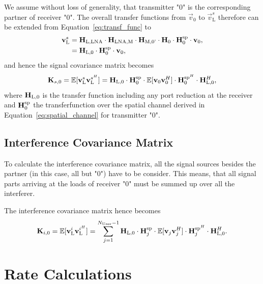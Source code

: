 We assume without loss of generality, that transmitter "0" is the corresponding partner of receiver "0".
The overall transfer functions from $\vec{v}_0$ to $\vec{v}_\text{L}^s$ therefore can be extended from Equation~\eqref{eq:transf_func} to
\begin{align}
\label{eq:transfer_function}
 \mathbf{v}_\text{L}^s&= \mathbf{H}_\text{L,LNA}\cdot\mathbf{H}_\text{LNA,M}\cdot\mathbf{H}_\text{M,0'}
		\cdot \mathbf{H}_0\cdot\mathbf{H}_{0}^{\text{sp}} \cdot\mathbf{v}_0,\\\nonumber
 &=\mathbf{H}_\text{L,0}\cdot \mathbf{H}_{0}^{\text{sp}}\cdot\mathbf{v}_0,
\end{align}
and hence the signal covariance matrix becomes
\begin{equation}
\label{eq:sig_cov}
\mathbf{K}_{s,0}=\mathbb{E}[\mathbf{v}_\text{L}^s\mathbf{v}_\text{L}^{s^H}] = 
	\mathbf{H}_\text{L,0}\cdot \mathbf{H}_{0}^{\text{sp}}
	\cdot\mathbb{E}[\mathbf{v}_0\mathbf{v}_0^H]\cdot
	\mathbf{H}_{0}^{\text{sp}^H} \cdot \mathbf{H}_\text{L,0}^H,
\end{equation}
where $\mathbf{H}_\text{L,0}$ is the transfer function including any port reduction at the receiver and $\mathbf{H}_{0}^{\text{sp}}$ the transferfunction over the spatial channel derived in Equation~\eqref{eq:spatial_channel} for transmitter "0".

\subsection{Interference Covariance Matrix}
\label{sec:int_cov}

To calculate the interference covariance matrix, all the signal sources besides the partner (in this case, all but "0") have to be consider.
This means, that all signal parts arriving at the loads of receiver "0" must be summed up over all the interferer.

The interference covariance matrix hence becomes 
\begin{equation}
\label{eq:interf_cov}
\mathbf{K}_{i,0}=\mathbb{E}[\mathbf{v}_\text{L}^i\mathbf{v}_\text{L}^{i^H}] = \sum_{j=1}^{N_\text{User}-1} 
	\mathbf{H}_\text{L,0} \cdot \mathbf{H}_{j}^{\text{sp}} \cdot 
	\mathbb{E}[\mathbf{v}_{j}\mathbf{v}_{j}^H] \cdot 
	\mathbf{H}_{j}^{\text{sp}^H} \cdot \mathbf{H}_\text{L,0}^H.
\end{equation}





\section{Rate Calculations}
\label{sec:rates}

